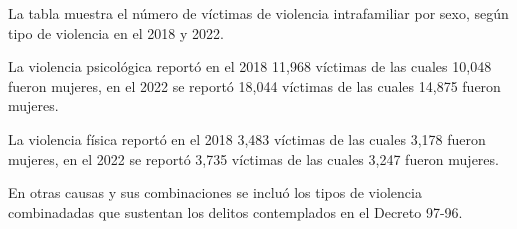 La tabla muestra el número de víctimas de violencia intrafamiliar por sexo, según tipo de violencia en el 2018 y 2022. 

La violencia psicológica reportó en el 2018 11,968 víctimas de las cuales 10,048 fueron mujeres, en el 2022 se reportó 18,044 víctimas de las cuales 14,875 fueron mujeres. 

La violencia física reportó en el 2018 3,483 víctimas de las cuales 3,178 fueron mujeres, en el 2022 se reportó 3,735 víctimas de las cuales 3,247 fueron mujeres. 

En otras causas y sus combinaciones se incluó los tipos de violencia combinadadas que sustentan los delitos contemplados en el Decreto 97-96.